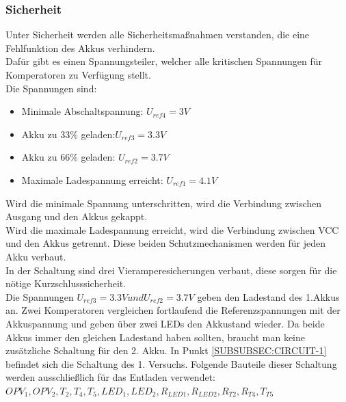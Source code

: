 \documentclass[12pt,a4paper]{article}
\begin{document}
{\subsubsection{Sicherheit}
\label{SUBSUBSEC:Security1}

Unter Sicherheit werden alle Sicherheitsmaßnahmen verstanden, die eine Fehlfunktion des Akkus verhindern. \\
Dafür gibt es einen Spannungsteiler, welcher alle kritischen Spannungen für Komperatoren zu Verfügung stellt. \\
Die Spannungen sind: 
\begin{itemize}
	\item{Minimale Abschaltspannung: $U_{ref4} = 3 V$}
	\item{Akku zu 33\% geladen:$ U_{ref3}=3.3V$}
	\item{Akku zu 66\% geladen: $U_{ref2} = 3.7V$}
	\item{Maximale Ladespannung erreicht: $U_{ref1} = 4.1V$}
\end{itemize}

Wird die minimale Spannung unterschritten, wird die Verbindung zwischen Ausgang und den Akkus gekappt. \\
Wird die maximale Ladespannung erreicht, wird die Verbindung zwischen VCC und den Akkus getrennt. Diese beiden Schutzmechanismen werden für jeden Akku verbaut.\\
In der Schaltung sind drei Vieramperesicherungen verbaut, diese sorgen für die nötige Kurzschlusssicherheit.  \\
Die Spannungen $ U_{ref3}=3.3V und U_{ref2} = 3.7V$ geben den Ladestand des 1.Akkus an. Zwei Komperatoren vergleichen fortlaufend die Referenzspannungen mit der Akkuspannung und geben über zwei LEDs den Akkustand wieder. Da beide Akkus immer den gleichen Ladestand haben sollten, braucht man keine zusätzliche Schaltung für den 2. Akku.
In Punkt \ref{SUBSUBSEC:CIRCUIT-1} befindet sich die Schaltung des 1. Versuchs. Folgende Bauteile dieser Schaltung werden ausschließlich für das Entladen verwendet:\\ $OPV_1, OPV_2,T_2,T_4, T_5,LED_1,LED_2,R_{LED1},R_{LED2},R_{T2}, R_{T4},T_{T5}$ 
\newpage
}
\end{document}
